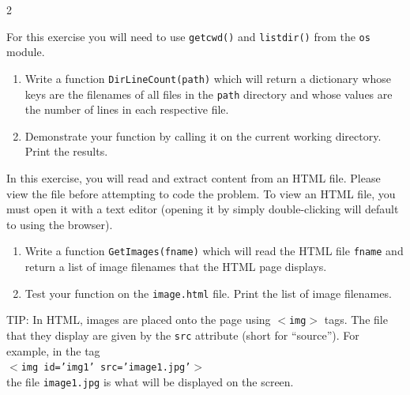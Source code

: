 \documentclass[12pt]{article}%
\newcommand{\code}[1]{\texttt{#1}}
\begin{document}
\begin{multicols*}{2}




\begin{Exercise}[origin={30 points}]

For this exercise you will need to use \code{getcwd()} and \code{listdir()} from the \code{os} module.
\begin{enumerate}
\item Write a function \code{DirLineCount(path)} which will return a dictionary whose keys are the filenames of all files in the \code{path} directory and whose values are the number of lines in each respective file.
\item Demonstrate your function by calling it on the current working directory. Print the results.
\end{enumerate}

\end{Exercise}

\begin{Exercise}[origin={30 points}]

In this exercise, you will read and extract content from an HTML file. Please view the file before attempting to code the problem. To view an HTML file, you must open it with a text editor (opening it by simply double-clicking will default to using the browser).

\begin{enumerate}
\item Write a function \code{GetImages(fname)} which will read the HTML file \code{fname} and return a list of image filenames that the HTML page displays.
\item Test your function on the \code{image.html} file. Print the list of image filenames.
\end{enumerate}

TIP: In HTML, images are placed onto the page using \code{$<$img$>$} tags. The file that they display are given by the \code{src} attribute (short for ``source''). For example, in the tag \\

\code{$<$img id='img1' src='image1.jpg'$>$} \\

the file \code{image1.jpg} is what will be displayed on the screen.

\end{Exercise}

\vfill\null
\columnbreak


\end{multicols*}
\end{document}
